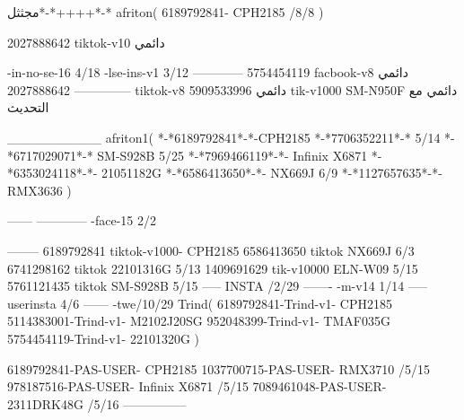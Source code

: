 مجثثل*-*++++*-*
afriton(
6189792841- CPH2185  /8/8
)

2027888642 tiktok-v10
دائمي

-in-no-se-16 4/18
-lse-ins-v1 3/12
------------
5754454119 facbook-v8
دائمي
--------------
2027888642 tiktok-v8
دائمي
5909533996 tik-v1000  SM-N950F
دائمي مع التحديث

__________
afriton1(
*-*6189792841*-*-CPH2185
*-*7706352211*-* 5/14
*-*6717029071*-*  SM-S928B 5/25
*-*7969466119*-*- Infinix X6871 \5
*-*6353024118*-*- 21051182G \5
*-*6586413650*-*- NX669J  6/9
*-*1127657635*-*- RMX3636 \5
)


------
------------
-face-15 2/2

--------
6189792841 tiktok-v1000- CPH2185 
6586413650 tiktok NX669J  6/3
6741298162 tiktok 22101316G  5/13
1409691629 tik-v10000 ELN-W09  5/15
5761121435 tiktok SM-S928B   5/15
-----
 INSTA /2/29
-------
-m-v14 1/14
-----
userinsta 4/6
------
-twe/10/29
Trind(
6189792841-Trind-v1- CPH2185 
5114383001-Trind-v1- M2102J20SG \5
952048399-Trind-v1- TMAF035G \5
5754454119-Trind-v1- 22101320G \5
)

6189792841-PAS-USER- CPH2185 
1037700715-PAS-USER- RMX3710  /5/15
978187516-PAS-USER- Infinix X6871  /5/15
7089461048-PAS-USER- 2311DRK48G  /5/16
    ---------------
